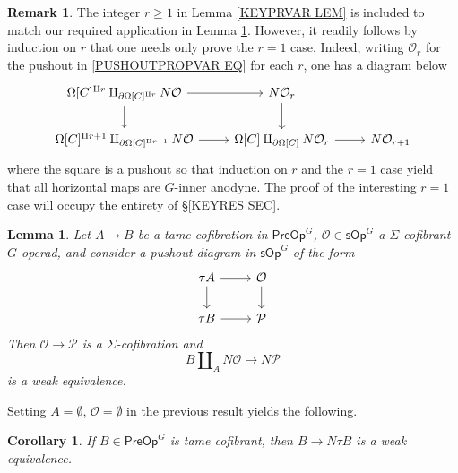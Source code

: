 \documentclass[a4paper,10pt]{article}%
\numberwithin{equation}{section}
\numberwithin{figure}{section}
\newtheorem{lemma}[equation]{Lemma}%
\newtheorem{corollary}[equation]{Corollary}%
\theoremstyle{definition} %
\newtheorem{remark}[equation]{Remark}%
\renewcommand{\O}{\ensuremath{\mathcal O}}
\newcommand{\1}{\ensuremath{\mathbbm 1}}%
\begin{document}
\begin{remark}
	The integer $r \geq 1$ in 
	Lemma \ref{KEYPRVAR LEM}
	is included to match our required application in Lemma \ref{UNITEQUIV LEM}.
	However, it readily follows by induction on $r$ that one needs only prove the $r=1$ case.
	Indeed, writing $\O_r$ for the pushout in 
	\eqref{PUSHOUTPROPVAR EQ}
	for each $r$,
	one has a diagram below
\begin{equation}
\begin{tikzcd}
	\Omega[C]^{\amalg r} \amalg_{\partial \Omega[C]^{\amalg r}} N\mathcal{O} \ar{r} \ar{d}
&
	N \mathcal{O}_r \ar{d}
\\
	\Omega[C]^{\amalg r+1} \amalg_{ \partial \Omega[C]^{\amalg r+1}} N \mathcal{O} \ar{r}
&
	\Omega[C] \amalg_{\partial \Omega[C]} N \mathcal{O}_r \ar{r}
&
	N \mathcal{O}_{r+1}
\end{tikzcd}
\end{equation}
	where the square is a pushout so that induction on $r$ and the $r=1$ case yield that all horizontal maps
	are $G$-inner anodyne.
	The proof of the interesting $r=1$ case will occupy the entirety of \S \ref{KEYRES SEC}.
\end{remark}





\begin{lemma}\label{UNITEQUIV LEM}
	Let $A \to B$ be a tame cofibration in $\mathsf{PreOp}^G$, 
	$\mathcal{O} \in \mathsf{sOp}^G$ a $\Sigma$-cofibrant 
	$G$-operad,
	and consider a pushout diagram in $\mathsf{sOp}^G$ of the form
\begin{equation}\label{THEPUSH EQ}
\begin{tikzcd}
	\tau A \ar{r} \ar{d} & \mathcal{O} \ar{d}
\\
	\tau B \ar{r} & \mathcal{P}
\end{tikzcd}
\end{equation}
	Then $\mathcal{O} \to \mathcal{P}$ is a $\Sigma$-cofibration and 
	\begin{equation}\label{UNITEQUIV EQ}
	B \amalg_{A} N \mathcal{O}
	\to 
	N \mathcal{P}
	\end{equation}
	is a weak equivalence.
\end{lemma}

Setting $A = \emptyset $, $\mathcal{O}= \emptyset$ in the previous result yields the following.

\begin{corollary}\label{KEYEQUIV COR}
	If $B \in \mathsf{PreOp}^G$ is tame cofibrant, then 
	$B \to N \tau B$ is a weak equivalence.
\end{corollary}
\end{document}
